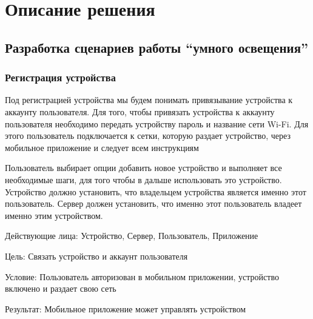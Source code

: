 \chapter{Описание  решения}

\label{cha:Solution}
 
\section{Разработка сценариев работы ``умного освещения''}
\subsection{Регистрация устройства}

Под регистрацией устройства мы будем понимать привязывание устройства к аккаунту пользователя. Для того, чтобы привязать устройства к аккаунту пользователя необходимо передать устройству пароль и название сети Wi-Fi. Для этого пользователь подключается к сетки, которую раздает устройство, через мобильное приложение и следует всем инструкциям

Пользователь выбирает опции добавить новое устройство и выполняет все необходимые шаги, для того чтобы в дальше использовать это устройство. Устройство должно установить, что владельцем устройства является именно этот пользователь. Сервер должен установить, что именно этот пользователь владеет именно этим устройством.

Действующие лица:	Устройство, Сервер, Пользователь, 
Приложение

Цель:	Связать устройство и аккаунт пользователя

Условие:	Пользователь авторизован в мобильном приложении, устройство включено и раздает свою сеть

Результат:	Мобильное приложение может управлять устройством

